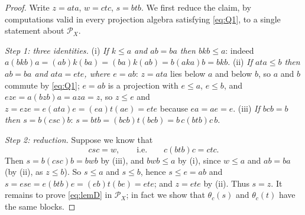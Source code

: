 \documentclass[11pt]{amsart}
\theoremstyle{definition}
\renewcommand{\P}{\mathcal{P}}
\begin{document}
\begin{proof}
Write $z=ata$, $w=ctc$, $s=btb$. We first reduce the claim, by computations valid in every projection algebra satisfying \eqref{eq:Q1}, to a single statement about $\P_X$.

\smallskip
\emph{Step 1: three identities.} (i) \emph{If $k\le a$ and $ab=ba$ then $bkb\le a$}: indeed $a(bkb)a=(ab)k(ba)=(ba)k(ab)=b(aka)b=bkb$. (ii) \emph{If $ata\le b$ then $ab=ba$ and $ata=ete$, where $e=ab$}: $z=ata$ lies below $a$ and below $b$, so $a$ and $b$ commute by \eqref{eq:Q1}; $e=ab$ is a projection with $e\le a$, $e\le b$, and $eze=a(bzb)a=aza=z$, so $z\le e$ and $z=eze=e(ata)e=(ea)t(ae)=ete$ because $ea=ae=e$. (iii) \emph{If $bcb=b$ then $s=b(csc)b$}: $s=btb=(bcb)t(bcb)=b\,c(btb)c\,b$.

\emph{Step 2: reduction.} Suppose we know that
\begin{equation}\label{eq:lemD}
csc=w,\qquad\text{i.e.}\qquad c(btb)c=ctc .
\end{equation}
Then $s=b(csc)b=bwb$ by (iii), and $bwb\le a$ by (i), since $w\le a$ and $ab=ba$ (by (ii), as $z\le b$). So $s\le a$ and $s\le b$, hence $s\le e=ab$ and $s=ese=e(btb)e=(eb)t(be)=ete$; and $z=ete$ by (ii). Thus $s=z$. It remains to prove \eqref{eq:lemD} in $\P_X$; in fact we show that $\theta_c(s)$ and $\theta_c(t)$ have the same blocks.


\end{proof}
\end{document}

